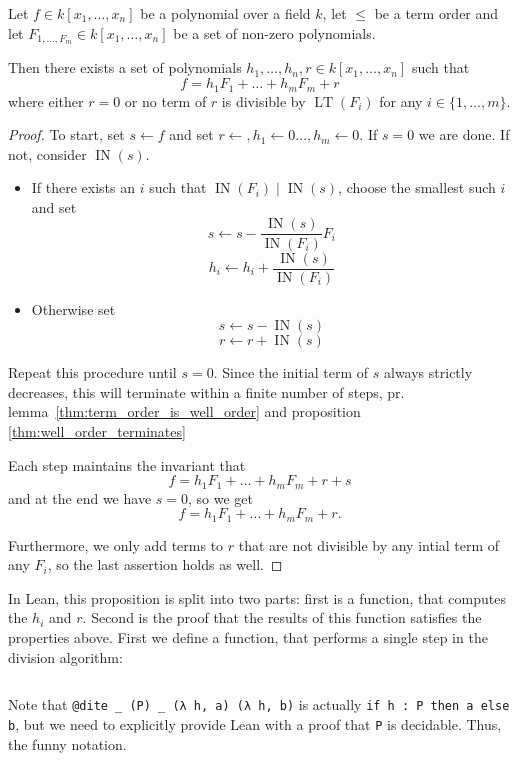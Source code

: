 \documentclass[a4paper, 12pt]{article}
\DeclareMathOperator{\IN}{IN}
\DeclareMathOperator{\LT}{LT}
\newcommand{\lean}[1]{\texttt{#1}}
\theoremstyle{changedot}
\theoremstyle{changedotbreak}
\theoremstyle{nonumberplain}
\newtheorem{proof}{Proof}
\begin{document}
\begin{proposition}
  Let $f \in k[x_{1}, \dots, x_{n}]$ be a polynomial over a field $k$, let $\le$ be a term order and let $F_{1, \dots, F_{m}} \in k[x_{1}, \dots, x_{n}]$ be a set of non-zero polynomials.

  Then there exists a set of polynomials $h_{1}, \dots, h_{n}, r \in k[x_{1}, \dots, x_{n}]$ such that \[f = h_{1}F_{1} + \dots + h_{m} F_{m} + r\] where either $r = 0$ or no term of $r$ is divisible by $\LT(F_{i})$ for any $i \in \{1, \dots, m\}$.
\end{proposition}
\begin{proof}
  To start, set $s \leftarrow f$ and set $r \leftarrow, h_{1} \leftarrow 0 \dots, h_{m} \leftarrow 0$. If $s = 0$ we are done. If not, consider $\IN(s)$.

  \begin{itemize}
    \item If there exists an $i$ such that $\IN(F_{i}) \mid \IN(s)$, choose the smallest such $i$ and set
      \[s \leftarrow s - \frac{\IN(s)}{\IN(F_{i})} F_{i}\]
      \[h_{i} \leftarrow h_{i} + \frac{\IN(s)}{\IN(F_{i})}\]
    \item Otherwise set
      \[s \leftarrow s - \IN(s)\]
      \[r \leftarrow r + \IN(s)\]
  \end{itemize}

  Repeat this procedure until $s = 0$. Since the initial term of $s$ always strictly decreases, this will terminate within a finite number of steps, pr. lemma~\ref{thm:term_order_is_well_order} and proposition \ref{thm:well_order_terminates}

  Each step maintains the invariant that \[f = h_{1}F_{1} + \dots + h_{m}F_{m} + r + s\] and at the end we have $s = 0$, so we get \[f = h_{1}F_{1} + \dots + h_{m}F_{m} + r.\]

  Furthermore, we only add terms to $r$ that are not divisible by any intial term of any $F_{i}$, so the last assertion holds as well.
\end{proof}

In Lean, this proposition is split into two parts: first is a function, that computes the $h_{i}$ and $r$. Second is the proof that the results of this function satisfies the properties above. First we define a function, that performs a single step in the division algorithm:

\inputminted[firstline=49, lastline=57]{lean}{../src/mv_division.lean}

Note that \lean{@dite _ (P) _ (λ h, a) (λ h, b)} is actually \lean{if h : P then a else b}, but we need to explicitly provide Lean with a proof that \lean{P} is decidable. Thus, the funny notation.
\end{document}
